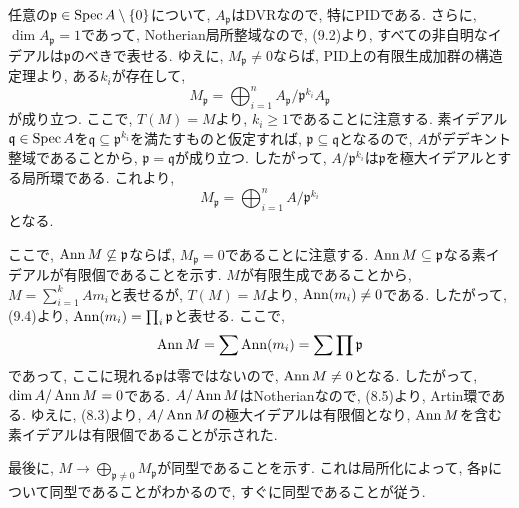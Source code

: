 \documentclass[dvipdfmx]{jsarticle}
\begin{document}
    \begin{problem}
        任意の$\mathfrak{p} \in \operatorname{Spec}{A} \setminus \{0\}$について, $A_\mathfrak{p}$はDVRなので, 特にPIDである.
        さらに, $\dim{A_\mathfrak{p}}=1$であって, Notherian局所整域なので, (9.2)より,
        すべての非自明なイデアルは$\mathfrak{p}$のべきで表せる.
        ゆえに, $M_\mathfrak{p} \neq 0$ならば,
        PID上の有限生成加群の構造定理より, ある$k_i$が存在して,
        \[
            M_\mathfrak{p} = \bigoplus_{i = 1}^n A_\mathfrak{p}/\mathfrak{p}^{k_i}A_\mathfrak{p}
        \]
        が成り立つ.
        ここで, $T(M) = M$より, $k_i \geq 1$であることに注意する.
        素イデアル$\mathfrak{q} \in \operatorname{Spec}{A}$を$\mathfrak{q} \subseteq \mathfrak{p}^{k_i}$を満たすものと仮定すれば,
        $\mathfrak{p} \subseteq \mathfrak{q}$となるので,
        $A$がデデキント整域であることから, $\mathfrak{p} = \mathfrak{q}$が成り立つ.
        したがって, $A/\mathfrak{p}^{k_i}$は$\mathfrak{p}$を極大イデアルとする局所環である.
        これより,
        \[
            M_\mathfrak{p} = \bigoplus_{i = 1}^n A/\mathfrak{p}^{k_i}
        \]
        となる.

        ここで, $\operatorname{Ann}{M} \not \subseteq \mathfrak{p}$ならば, $M_\mathfrak{p} = 0$であることに注意する.
        $\operatorname{Ann}{M} \subseteq \mathfrak{p}$なる素イデアルが有限個であることを示す.
        $M$が有限生成であることから, $M = \sum_{i = 1}^k Am_i$と表せるが,
        $T(M) = M$より, $\operatorname{Ann}(m_i) \neq 0$である.
        したがって, (9.4)より, $\operatorname{Ann}(m_i) = \prod_{i}\mathfrak{p}$と表せる.
        ここで,
        \[
            \operatorname{Ann}{M} = \sum \operatorname{Ann}(m_i) = \sum \prod \mathfrak{p}
        \]
        であって, ここに現れる$\mathfrak{p}$は零ではないので,
        $\operatorname{Ann}{M} \neq 0$となる.
        したがって, $\dim{A/\operatorname{Ann}{M}} = 0$である.
        $A/\operatorname{Ann}{M}$はNotherianなので, (8.5)より, Artin環である.
        ゆえに, (8.3)より, $A/\operatorname{Ann}{M}$の極大イデアルは有限個となり,
        $\operatorname{Ann}{M}$を含む素イデアルは有限個であることが示された.

        最後に, $M \to \bigoplus_{\mathfrak{p} \neq 0} M_\mathfrak{p}$が同型であることを示す.
        これは局所化によって, 各$\mathfrak{p}$について同型であることがわかるので, すぐに同型であることが従う.
    \end{problem}
\end{document}
